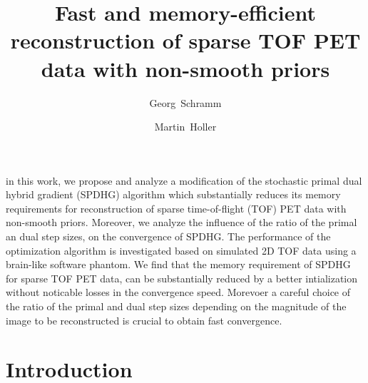 \documentclass[11pt,twocolumn,twoside]{article}
\begin{document}
\title{Fast and memory-efficient reconstruction of sparse TOF PET data with non-smooth priors} 

\author[1]{Georg~Schramm}
\author[2]{Martin~Holler}



\maketitle
\thispagestyle{fancy}





\begin{customabstract}
in this work, we propose and analyze a modification of the stochastic primal dual hybrid gradient
(SPDHG) algorithm which substantially reduces its memory requirements 
for reconstruction of sparse time-of-flight (TOF) PET data with non-smooth priors.
Moreover, we analyze the influence of the ratio of the primal an dual step sizes, 
on the convergence of SPDHG.
The performance of the optimization algorithm is investigated based on simulated 2D TOF
data using a brain-like software phantom.
We find that the memory requirement of SPDHG for sparse TOF PET data, can be
substantially reduced by a better intialization without noticable losses in the convergence speed.
Morevoer a careful choice of the ratio of the primal and dual step sizes 
depending on the magnitude of the image to be reconstructed is crucial to obtain fast convergence.
\end{customabstract}


\section{Introduction}
\end{document}
